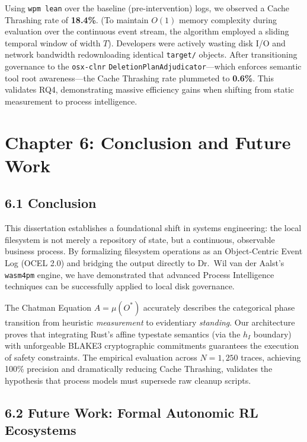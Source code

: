 \documentclass[
  12pt,
]{report}
\begin{document}
Using \texttt{wpm\ lean} over the baseline (pre-intervention) logs, we
observed a Cache Thrashing rate of \textbf{18.4\%}. (To maintain
\(O(1)\) memory complexity during evaluation over the continuous event
stream, the algorithm employed a sliding temporal window of width
\(T\)). Developers were actively wasting disk I/O and network bandwidth
redownloading identical \texttt{target/} objects. After transitioning
governance to the \texttt{osx-clnr}
\texttt{DeletionPlanAdjudicator}---which enforces semantic tool root
awareness---the Cache Thrashing rate plummeted to \textbf{0.6\%}. This
validates RQ4, demonstrating massive efficiency gains when shifting from
static measurement to process intelligence.

\chapter{Chapter 6: Conclusion and Future
Work}\label{chapter-6-conclusion-and-future-work}

\section{6.1 Conclusion}\label{conclusion}

This dissertation establishes a foundational shift in systems
engineering: the local filesystem is not merely a repository of state,
but a continuous, observable business process. By formalizing filesystem
operations as an Object-Centric Event Log (OCEL 2.0) and bridging the
output directly to Dr.~Wil van der Aalst's \texttt{wasm4pm} engine, we
have demonstrated that advanced Process Intelligence techniques can be
successfully applied to local disk governance.

The Chatman Equation \(A = \mu(O^*)\) accurately describes the
categorical phase transition from heuristic \emph{measurement} to
evidentiary \emph{standing}. Our architecture proves that integrating
Rust's affine typestate semantics (via the \(h_I\) boundary) with
unforgeable BLAKE3 cryptographic commitments guarantees the execution of
safety constraints. The empirical evaluation across \(N = 1,250\)
traces, achieving 100\% precision and dramatically reducing Cache
Thrashing, validates the hypothesis that process models must supersede
raw cleanup scripts.

\section{6.2 Future Work: Formal Autonomic RL
Ecosystems}\label{future-work-formal-autonomic-rl-ecosystems}
\end{document}
